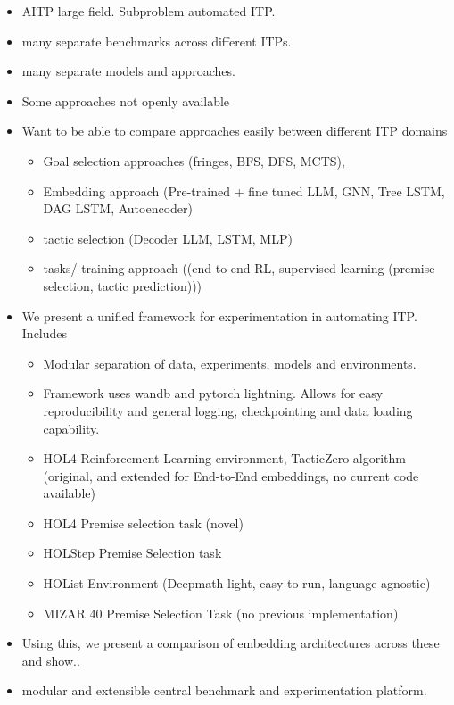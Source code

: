 \documentclass{article}
\begin{document}
    \begin{itemize}
        \item AITP large field. Subproblem automated ITP.
        \item many separate benchmarks across different ITPs.
        \item many separate models and approaches.
        \item Some approaches not openly available
        \item Want to be able to compare approaches easily between different ITP domains
        \begin{itemize}
            \item Goal selection approaches (fringes, BFS, DFS, MCTS),
            \item Embedding approach (Pre-trained + fine tuned LLM, GNN, Tree LSTM, DAG LSTM, Autoencoder)
            \item tactic selection (Decoder LLM, LSTM, MLP)
            \item tasks/ training approach ((end to end RL, supervised learning (premise selection, tactic prediction)))
        \end{itemize}
        \item We present a unified framework for experimentation in automating ITP. Includes
        \begin{itemize}
            \item Modular separation of data, experiments, models and environments.
            \item Framework uses wandb and pytorch lightning.
            Allows for easy reproducibility and general logging, checkpointing and data loading capability.
            \item HOL4 Reinforcement Learning environment, TacticZero algorithm (original, and extended for End-to-End embeddings, no current code available)
            \item HOL4 Premise selection task (novel)
            \item HOLStep Premise Selection task
            \item HOList Environment (Deepmath-light, easy to run, language agnostic)
            \item MIZAR 40 Premise Selection Task (no previous implementation)
        \end{itemize}
        \item Using this, we present a comparison of embedding architectures across these and show..
        \item modular and extensible central benchmark and experimentation platform.
    \end{itemize}
\end{document}
